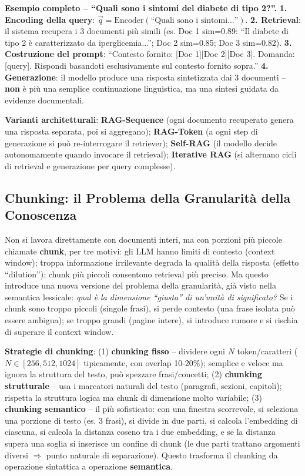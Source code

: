 \documentclass[12pt,a4paper]{article}
\begin{document}
\begin{examplebox}
\textbf{Esempio completo -- ``Quali sono i sintomi del diabete di tipo 2?''.}
\textbf{1. Encoding della query}: $\vec{q}=\text{Encoder}(\text{``Quali sono i sintomi...''})$. \textbf{2. Retrieval}: il sistema recupera i 3 documenti pi\`u simili (es. Doc 1 sim=0.89: ``Il diabete di tipo 2 \`e caratterizzato da iperglicemia...''; Doc 2 sim=0.85; Doc 3 sim=0.82). \textbf{3. Costruzione del prompt}: ``Contesto fornito: [Doc 1][Doc 2][Doc 3]. Domanda: [query]. Rispondi basandoti esclusivamente sul contesto fornito sopra.'' \textbf{4. Generazione}: il modello produce una risposta sintetizzata dai 3 documenti -- \textbf{non} \`e pi\`u una semplice continuazione linguistica, ma una sintesi guidata da evidenze documentali.
\end{examplebox}

\textbf{Varianti architetturali}: \textbf{RAG-Sequence} (ogni documento recuperato genera una risposta separata, poi si aggregano); \textbf{RAG-Token} (a ogni step di generazione si pu\`o re-interrogare il retriever); \textbf{Self-RAG} (il modello decide autonomamente quando invocare il retrieval); \textbf{Iterative RAG} (si alternano cicli di retrieval e generazione per query complesse).

\subsection{Chunking: il Problema della Granularit\`a della Conoscenza}

Non si lavora direttamente con documenti interi, ma con porzioni pi\`u piccole chiamate \textbf{chunk}, per tre motivi: gli LLM hanno limiti di contesto (context window); troppa informazione irrilevante degrada la qualit\`a della risposta (effetto ``dilution''); chunk pi\`u piccoli consentono retrieval pi\`u preciso. Ma questo introduce una nuova versione del problema della granularit\`a, gi\`a visto nella semantica lessicale: \emph{qual \`e la dimensione ``giusta'' di un'unit\`a di significato?} Se i chunk sono troppo piccoli (singole frasi), si perde contesto (una frase isolata pu\`o essere ambigua); se troppo grandi (pagine intere), si introduce rumore e si rischia di superare il context window.

\textbf{Strategie di chunking}: (1) \textbf{chunking fisso} -- dividere ogni $N$ token/caratteri ($N\in[256,512,1024]$ tipicamente, con overlap 10-20\%); semplice e veloce ma ignora la struttura del testo, pu\`o spezzare frasi/concetti; (2) \textbf{chunking strutturale} -- usa i marcatori naturali del testo (paragrafi, sezioni, capitoli); rispetta la struttura logica ma chunk di dimensione molto variabile; (3) \textbf{chunking semantico} -- il pi\`u sofisticato: con una finestra scorrevole, si seleziona una porzione di testo (es. 3 frasi), si divide in due parti, si calcola l'embedding di ciascuna, si calcola la distanza coseno tra i due embedding, e se la distanza supera una soglia si inserisce un confine di chunk (le due parti trattano argomenti diversi $\Rightarrow$ punto naturale di separazione). Questo trasforma il chunking da operazione sintattica a operazione \textbf{semantica}.
\end{document}
